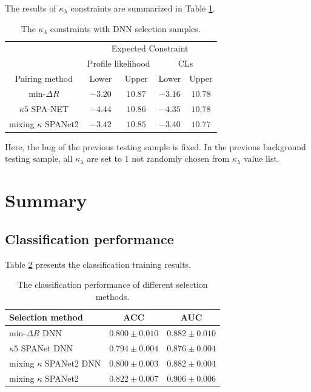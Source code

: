 \documentclass[12pt]{article}
\begin{document}
		The results of $\kappa_\lambda$ constraints are summarized in Table \ref{tab:kappa_constraint_DNN}. 
		\begin{table}[htpb]
			\centering
			\caption{The $\kappa_\lambda$ constraints with DNN selection samples.}
			\label{tab:kappa_constraint_DNN}
			\begin{tabular}{c|cc|cc}
								  & \multicolumn{4}{c}{Expected Constraint}                          \\
								  & \multicolumn{2}{c}{Profile likelihood} & \multicolumn{2}{c}{CLs} \\ \hline
			Pairing method        & Lower              & Upper             & Lower      & Upper      \\ \hline
			$\text{min-}\Delta R$ & $-3.20$            & $10.87$             & $-3.16$      & $10.78$    \\
			$\kappa 5$ SPA-NET    & $-4.44$            & $10.86$             & $-4.35$      & $10.78$   \\
			mixing $\kappa$ SPANet2& $-3.42$           & $10.85$             & $-3.40$      & $10.77$   
			\end{tabular}
		\end{table}

		Here, the bug of the previous testing sample is fixed. In the previous background testing sample, all $\kappa_\lambda$ are set to $1$ not randomly chosen from $\kappa_\lambda$ value list.
\section{Summary}%
\label{sec:summary}
	\subsection{Classification performance}%
	\label{sub:classification_performance}
		Table \ref{tab:classification_results_summary2} presents the classification training results.
		\begin{table}[htpb]
			\centering
			\caption{The classification performance of different selection methods.}
			\label{tab:classification_results_summary2}
			\begin{tabular}{l|cc}
			Selection method          & ACC   & AUC   \\ \hline
			$\text{min-}\Delta R$ DNN   & $0.800 \pm 0.010$ & $0.882 \pm 0.010$ \\
			$\kappa 5$ SPANet DNN       & $0.794 \pm 0.004$ & $0.876 \pm 0.004$ \\
			mixing $\kappa$ SPANet2 DNN & $0.800 \pm 0.003$ & $0.882 \pm 0.004$ \\
			mixing $\kappa$ SPANet2     & $0.822 \pm 0.007$ & $0.906 \pm 0.006$ 
			\end{tabular}			
		\end{table}
\end{document}
